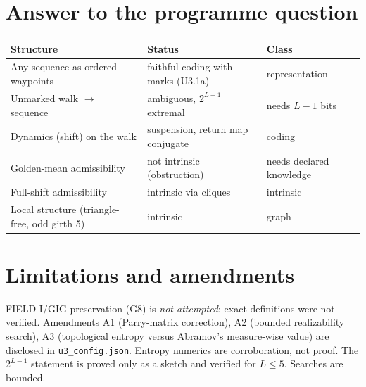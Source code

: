 \documentclass[11pt]{article}
\begin{document}
\section{Answer to the programme question}
\begin{tabular}{@{}lll@{}}\toprule Structure & Status & Class\\\midrule
Any sequence as ordered waypoints & faithful coding with marks (U3.1a) & representation\\
Unmarked walk $\to$ sequence & ambiguous, $2^{L-1}$ extremal & needs $L-1$ bits\\
Dynamics (shift) on the walk & suspension, return map conjugate & coding\\
Golden-mean admissibility & not intrinsic (obstruction) & needs declared knowledge\\
Full-shift admissibility & intrinsic via cliques & intrinsic\\
Local structure (triangle-free, odd girth 5) & intrinsic & graph\\\bottomrule\end{tabular}
\section{Limitations and amendments}
FIELD-I/GIG preservation (G8) is \emph{not attempted}: exact definitions were not verified. Amendments A1 (Parry-matrix correction), A2 (bounded realizability search), A3 (topological entropy versus Abramov's measure-wise value) are disclosed in \texttt{u3\_config.json}. Entropy numerics are corroboration, not proof. The $2^{L-1}$ statement is proved only as a sketch and verified for $L\le5$. Searches are bounded.
\end{document}
